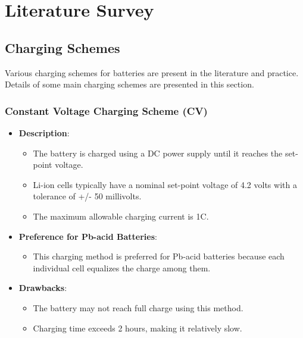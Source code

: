 \documentclass[conference]{IEEEtran}
\begin{document}
\section{Literature Survey}

\subsection{Charging Schemes}
\hspace{0.5cm}Various charging schemes for batteries are present in the 
literature and practice. Details of some main charging 
schemes are presented in this section. 
\subsubsection{Constant Voltage Charging Scheme (CV) }
\begin{itemize}
    \item \textbf{Description}:
    \begin{itemize}
        \item The battery is charged using a DC power supply until it reaches the set-point voltage.
        \item Li-ion cells typically have a nominal set-point voltage of 4.2 volts with a tolerance of +/- 50 millivolts.
        \item The maximum allowable charging current is 1C.
    \end{itemize}
    
    \item \textbf{Preference for Pb-acid Batteries}:
    \begin{itemize}
        \item This charging method is preferred for Pb-acid batteries because each individual cell equalizes the charge among them.
    \end{itemize}
    
    \item \textbf{Drawbacks}:
    \begin{itemize}
        \item The battery may not reach full charge using this method.
        \item Charging time exceeds 2 hours, making it relatively slow.
    \end{itemize}
\end{itemize}
\end{document}
